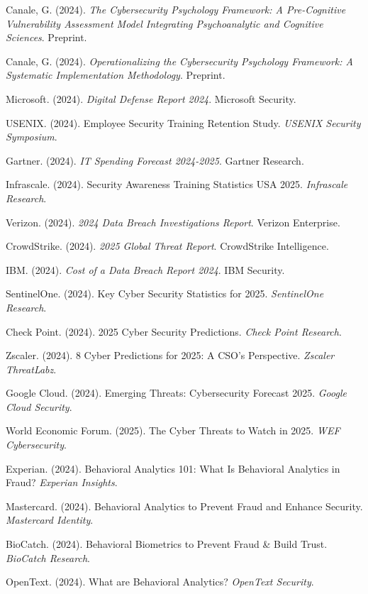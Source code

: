 \documentclass[11pt,a4paper]{article}
\begin{document}
\begin{thebibliography}{99}

Canale, G. (2024). \textit{The Cybersecurity Psychology Framework: A Pre-Cognitive Vulnerability Assessment Model Integrating Psychoanalytic and Cognitive Sciences}. Preprint.

Canale, G. (2024). \textit{Operationalizing the Cybersecurity Psychology Framework: A Systematic Implementation Methodology}. Preprint.

Microsoft. (2024). \textit{Digital Defense Report 2024}. Microsoft Security.

USENIX. (2024). Employee Security Training Retention Study. \textit{USENIX Security Symposium}.

Gartner. (2024). \textit{IT Spending Forecast 2024-2025}. Gartner Research.

Infrascale. (2024). Security Awareness Training Statistics USA 2025. \textit{Infrascale Research}.

Verizon. (2024). \textit{2024 Data Breach Investigations Report}. Verizon Enterprise.

CrowdStrike. (2024). \textit{2025 Global Threat Report}. CrowdStrike Intelligence.

IBM. (2024). \textit{Cost of a Data Breach Report 2024}. IBM Security.

SentinelOne. (2024). Key Cyber Security Statistics for 2025. \textit{SentinelOne Research}.

Check Point. (2024). 2025 Cyber Security Predictions. \textit{Check Point Research}.

Zscaler. (2024). 8 Cyber Predictions for 2025: A CSO's Perspective. \textit{Zscaler ThreatLabz}.

Google Cloud. (2024). Emerging Threats: Cybersecurity Forecast 2025. \textit{Google Cloud Security}.

World Economic Forum. (2025). The Cyber Threats to Watch in 2025. \textit{WEF Cybersecurity}.

Experian. (2024). Behavioral Analytics 101: What Is Behavioral Analytics in Fraud? \textit{Experian Insights}.

Mastercard. (2024). Behavioral Analytics to Prevent Fraud and Enhance Security. \textit{Mastercard Identity}.

BioCatch. (2024). Behavioral Biometrics to Prevent Fraud \& Build Trust. \textit{BioCatch Research}.

OpenText. (2024). What are Behavioral Analytics? \textit{OpenText Security}.

\end{thebibliography}
\end{document}
